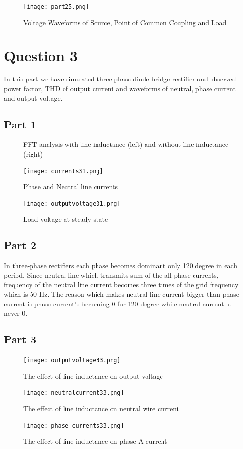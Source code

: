 \documentclass[fleqn, a4paper]{report}
\begin{document}
\begin{figure}[H]
  \texttt{[image: part25.png]}
  \caption{Voltage Waveforms of Source, Point of Common Coupling and Load}
  \label{fig:simulink3}
\end{figure}


\section*{Question 3}
In this part we have simulated three-phase diode bridge rectifier and observed power factor, THD of output current and waveforms of neutral, phase current and output voltage.
\subsection*{Part 1}
\begin{figure}[H]%
    \centering
    \qquad
    \caption{FFT analysis with line inductance (left) and without line inductance (right)}%
    \label{fig:example}%
\end{figure}
\begin{figure}[H]
  \texttt{[image: currents31.png]}
  \caption{Phase and Neutral line currents}
  \label{fig:simulink3}
\end{figure}

\begin{figure}[H]
  \texttt{[image: outputvoltage31.png]}
  \caption{Load voltage at steady state}
  \label{fig:simulink3}
\end{figure}
\subsection*{Part 2}

In three-phase rectifiers each phase becomes dominant only 120 degree in each period. Since neutral line which transmits sum of the all phase currents, frequency of the neutral line current becomes three times of the grid frequency which is 50 Hz. The reason which makes neutral line current bigger than phase current is phase current's becoming 0 for 120 degree while neutral current is never 0.
\subsection*{Part 3}
\begin{figure}[H]
  \texttt{[image: outputvoltage33.png]}
  \caption{The effect of line inductance on output voltage}
  \label{fig:simulink3}
\end{figure}
\begin{figure}[H]
  \texttt{[image: neutralcurrent33.png]}
  \caption{The effect of line inductance on neutral wire current}
  \label{fig:simulink3}
\end{figure}
\begin{figure}[H]
  \texttt{[image: phase\_currents33.png]}
  \caption{The effect of line inductance on phase A current}
  \label{fig:simulink3}
\end{figure}
\end{document}
